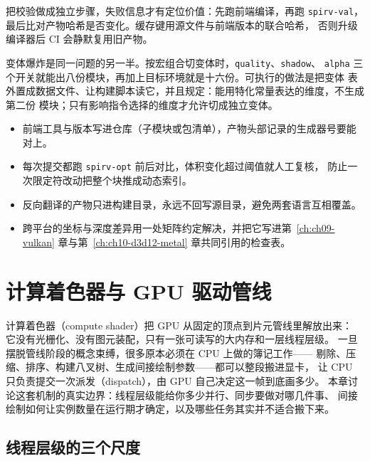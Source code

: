 \documentclass[12pt,a4paper,fontset=fandol]{ctexbook}
\newcommand{\Tp}[1]{\texttt{#1}}
\newcommand{\Bk}{\discretionary{}{}{}}
\newcommand{\Lang}[1]{\textsf{#1}}
\newcommand{\DomCPU}{\Lang{CPU}}
\newcommand{\DomGPU}{\Lang{GPU}}
\begin{document}
\begin{note}[title={CI 里让着色器步骤可判定}]
把校验做成独立步骤，失败信息才有定位价值：先跑前端编译，再跑
\Tp{spirv\Bk-val}，最后比对产物哈希是否变化。缓存键用源文件与前端版本的联合哈希，
否则升级编译器后 CI 会静默复用旧产物。
\end{note}

变体爆炸是同一问题的另一半。按宏组合切变体时，\Tp{quality}、\Tp{shadow}、
\Tp{alpha} 三个开关就能出八份模块，再加上目标环境就是十六份。可执行的做法是把变体
表外置成数据文件、让构建脚本读它，并且规定：能用特化常量表达的维度，不生成第二份
模块；只有影响指令选择的维度才允许切成独立变体。

\begin{bestpractice}[title={编译链的维护约定}]
\begin{itemize}
\item 前端工具与版本写进仓库（子模块或包清单），产物头部记录的生成器号要能对上。
\item 每次提交都跑 \Tp{spirv\Bk-opt} 前后对比，体积变化超过阈值就人工复核，
防止一次限定符改动把整个块推成动态索引。
\item 反向翻译的产物只进构建目录，永远不回写源目录，避免两套语言互相覆盖。
\item 跨平台的坐标与深度差异用一处矩阵约定解决，并把它写进第~\ref{ch:ch09-vulkan}
章与第~\ref{ch:ch10-d3d12-metal} 章共同引用的检查表。
\end{itemize}
\end{bestpractice}

\chapter{计算着色器与 GPU 驱动管线}
\label{ch:ch08-compute-driven}

计算着色器（compute shader）把 \DomGPU{} 从固定的顶点到片元管线里解放出来：
它没有光栅化、没有图元装配，只有一张可读写的大内存和一层线程层级。
一旦摆脱管线阶段的概念束缚，很多原本必须在 \DomCPU{} 上做的簿记工作——
剔除、压缩、排序、构建八叉树、生成间接绘制参数——都可以整段搬进显卡，
让 \DomCPU{} 只负责提交一次派发（dispatch），由 \DomGPU{} 自己决定这一帧到底画多少。
本章讨论这套机制的真实边界：线程层级能给你多少并行、同步要做对哪几件事、
间接绘制如何让实例数量在运行期才确定，以及哪些任务其实并不适合搬下来。

\section{线程层级的三个尺度}
\end{document}
